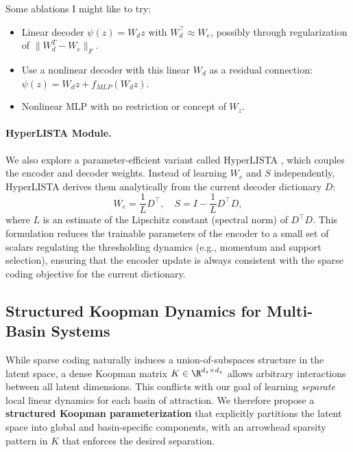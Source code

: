 Some ablations I might like to try:
\begin{itemize}
    \item Linear decoder $\psi(z) = W_d z$ with $W_d^\top \approx W_e$, possibly through regularization of $\lVert W_d^T - W_e \rVert_F$.
    \item Use a nonlinear decoder with this linear $W_d$ as a residual connection: $\psi(z) = W_d z + f_{MLP}(W_d z)$.
    \item Nonlinear MLP with no restriction or concept of $W_z$.
\end{itemize}

\paragraph{HyperLISTA Module.}
We also explore a parameter-efficient variant called HyperLISTA \citep{chen_hyperparameter_lista_2021}, which couples the encoder and decoder weights. Instead of learning $W_e$ and $S$ independently, HyperLISTA derives them analytically from the current decoder dictionary $D$:
\begin{equation}
    W_e = \frac{1}{L} D^\top, \quad S = I - \frac{1}{L} D^\top D,
\end{equation}
where $L$ is an estimate of the Lipschitz constant (spectral norm) of $D^\top D$. This formulation reduces the trainable parameters of the encoder to a small set of scalars regulating the thresholding dynamics (e.g., momentum and support selection), ensuring that the encoder update is always consistent with the sparse coding objective for the current dictionary.

\subsection{Structured Koopman Dynamics for Multi-Basin Systems}
\label{sec:structured-koopman}

While sparse coding naturally induces a union-of-subspaces structure in the latent space, a dense Koopman matrix $K \in \R^{d_z \times d_z}$ allows arbitrary interactions between all latent dimensions. This conflicts with our goal of learning \emph{separate} local linear dynamics for each basin of attraction. We therefore propose a \textbf{structured Koopman parameterization} that explicitly partitions the latent space into global and basin-specific components, with an arrowhead sparsity pattern in $K$ that enforces the desired separation.

